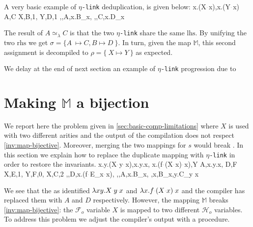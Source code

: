 \documentclass[sigconf,natbib=false,review]{acmart}
\newcommand{\appsep}{\ensuremath{\textcolor{lightgray}{\cdot}}}
\newcommand{\UnifRel}{\ensuremath{\simeq}}
\newcommand{\Ue}{\ensuremath{\UnifRel_\lambda}\xspace}
\newcommand{\linkMacro}[1]{\ensuremath{#1}\texttt{-link}\xspace}
\newcommand{\linketa} {\linkMacro{\eta}}
\newcommand{\Fo}{\ensuremath{\mathcal{F}_{\!o}\xspace}} %
\newcommand{\Ho}{\ensuremath{\mathcal{H}_o}\xspace}
\newcommand{\lhs}{\ensuremath{\mathrm{lhs}}\xspace}
\newcommand{\rhs}{\ensuremath{\mathrm{rhs}}\xspace}
\newcommand{\mapStore}{\ensuremath{\mathbb{M}}\xspace}
\begin{document}
A very basic example of \linketa deduplication, is given below:
\printAlll
  {{{\lambda x.(X\appsep x),\lambda x.(Y\appsep x)}}}
  {{{A,C}}}
  {{{X,B,1},
    {Y,D,1}}}
  {{{\eta,,A,\lambda x.B_{x}},
    {\eta,,C,\lambda x.D_{x}}}}

\noindent
The result of $A \Ue{} C$ is that the two \linketa share the same \lhs.
By unifying the two \rhs we get
$\sigma = \{ A~ \mapsto C, B \mapsto D ~\}$.
In turn, given the map \mapStore, this second assignment is decompiled to
$\rho = \{~ X \mapsto Y ~\}$ as expected.

We delay at the end of  next section an example of \linketa progression due to
\progressetaright


\section{Making \mapStore a bijection}
\label{sec:invariant1}
We report here the problem given in \cref{sec:basic-comp-limitations} where
$X$ is used with two different arities and the output of the compilation does
not respect \cref{inv:map-bijective}. Moreover, merging the two mappings
for $s$ would break .
In this section we explain how to replace the duplicate mapping with
\linketa in order to restore the invariants.
\printAlll
  {{{\lambda x.\lambda y.(X\appsep y\appsep x),\lambda x.\lambda y.x},
    {\lambda x.(f\appsep (X\appsep x)\appsep x),Y}}}
  {{{A,\lambda x.\lambda y.x},
    {D,F}}}
  {{{X,E,1},
    {Y,F,0},
    {X,C,2}}}
  {{{\eta,,D,\lambda x.(f\appsep E_{x}\appsep x)},
    {\eta,,A,\lambda x.B_{x}},
    {\eta,x,B_{x},\lambda y.C_{y x}}}}

We see that the  as identified $\lambda xy.X \appsep y \appsep
x$ and $\lambda x.f\appsep (X \appsep x) \appsep x$ and the compiler has
replaced them with $A$ and $D$ respectively.
However, the mapping \mapStore breaks \cref{inv:map-bijective}: the \Fo{}
variable $X$ is mapped to two different \Ho variables. To address this problem
we adjust the compiler's output with a  procedure.
\end{document}
